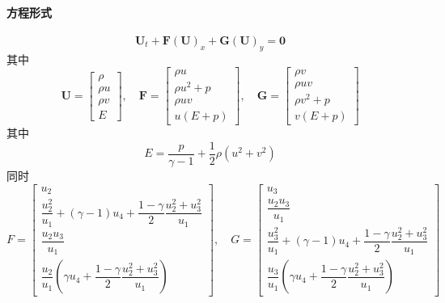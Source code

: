 \documentclass{book}
\begin{document}
\paragraph{方程形式}
\begin{equation}
    \mathbf{U}_{t}+\mathbf{F}(\mathbf{U})_{x}+\mathbf{G}(\mathbf{U})_{y}=\mathbf{0}
\end{equation}
其中
\begin{equation}
    \mathbf{U}=\left[\begin{array}{c}
            \rho   \\
            \rho u \\
            \rho v \\
            E
        \end{array}\right], \quad \mathbf{F}=\left[\begin{array}{c}
            \rho u       \\
            \rho u^{2}+p \\
            \rho u v     \\
            u(E+p)
        \end{array}\right], \quad \mathbf{G}=\left[\begin{array}{c}
            \rho v       \\
            \rho u v     \\
            \rho v^{2}+p \\
            v(E+p)
        \end{array}\right]
\end{equation}
其中
\begin{equation}
    E=\dfrac{p}{\gamma-1}+\dfrac{1}{2} \rho\left(u^{2}+v^{2}\right)
\end{equation}
同时
\begin{equation}
    F = \begin{bmatrix}
        u_2                                                                          \\
        \dfrac{u_2^2}{u_1}+(\gamma-1)u_4+\dfrac{1-\gamma}{2}\dfrac{u_2^2+u_3^2}{u_1} \\
        \dfrac{u_2u_3}{u_1}                                                          \\
        \dfrac{u_2}{u_1}\left(\gamma u_4+\dfrac{1-\gamma}{2}\dfrac{u_2^2+u_3^2}{u_1}\right)
    \end{bmatrix}
    ,\quad G=\begin{bmatrix}
        u_3                                                                          \\
        \dfrac{u_2u_3}{u_1}                                                          \\
        \dfrac{u_3^2}{u_1}+(\gamma-1)u_4+\dfrac{1-\gamma}{2}\dfrac{u_2^2+u_3^2}{u_1} \\
        \dfrac{u_3}{u_1}\left(\gamma u_4+\dfrac{1-\gamma}{2}\dfrac{u_2^2+u_3^2}{u_1}\right)
    \end{bmatrix}
\end{equation}
\end{document}
